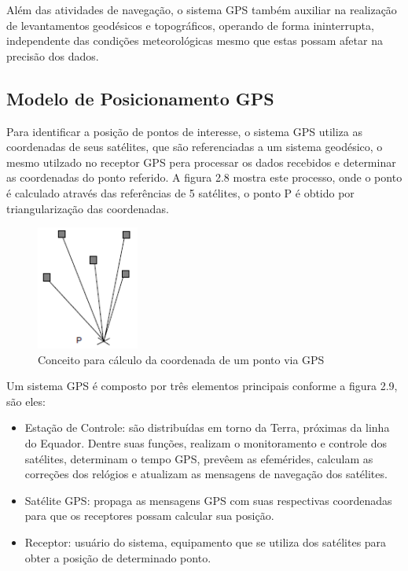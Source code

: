 Além das atividades de navegação, o sistema GPS também auxiliar na realização de levantamentos geodésicos e topográficos, operando de forma ininterrupta, independente das condições meteorológicas mesmo que estas possam afetar na precisão dos dados.

\subsection{Modelo de Posicionamento GPS}

Para identificar a posição de pontos de interesse, o sistema GPS utiliza as coordenadas de seus satélites, que são referenciadas a um sistema geodésico, o mesmo utilzado no receptor GPS pera processar os dados recebidos e determinar as coordenadas do ponto referido. A figura 2.8 mostra este processo, onde o ponto é calculado através das referências de 5 satélites, o ponto P é obtido por triangularização das coordenadas.

\begin{figure}[h!]
			\centering
			\includegraphics[width=0.3\textwidth]{figures/triangGPS.png}
			\caption{Conceito para c\'{a}lculo da coordenada de um ponto via GPS}
			\label{1}
\end{figure}

Um sistema GPS é composto por três elementos principais conforme a figura 2.9, são eles:

\begin{itemize}
	\item Estação de Controle: são distribuídas em torno da Terra, próximas da linha do Equador. Dentre suas funções, realizam o monitoramento e controle dos satélites, determinam o tempo GPS, prevêem as efemérides, calculam as correções dos relógios e atualizam as mensagens de navegação dos satélites.
	\item Satélite GPS: propaga as mensagens GPS com suas respectivas coordenadas para que os receptores possam calcular sua posição.
	\item Receptor: usuário do sistema, equipamento que se utiliza dos satélites para obter a posição de determinado ponto.	
\end{itemize}


